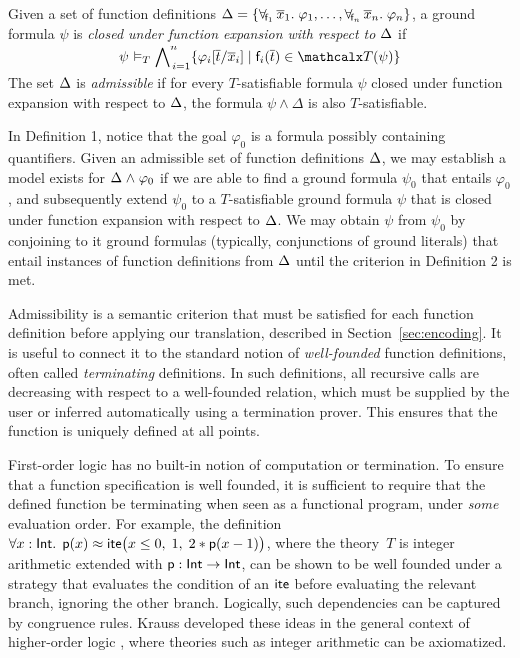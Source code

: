 \begin{definition}\rm
Given a set of function definitions
$\DDD = \{ \forallf{\con{f}_1} \vec x_1.\; \varphi_1, \dotsc, \forallf{\con{f}_n} \vec x_n.\; \varphi_n \}$,
a ground formula $\psi$
is \emph{closed under function expansion with respect to $\DDD$} if
\[\psi \models_T \smash{\bigwedge\nolimits_{\,i=1}^{n} \{ \varphi_i[ \vec t / \vec x_i ] \mid \con{f}_i( \vec t ) \in \terms( \psi ) \}}\]
The set $\DDD$ is \emph{admissible} if for every $T$-satisfiable formula
$\psi$ closed under function expansion with respect to $\DDD$,
the formula
$\psi \wedge \Delta$ is also $T$-satisfiable.
\end{definition}

In Definition 1, notice that the goal $\varphi_0$ is a formula possibly containing quantifiers.
Given an admissible set of function definitions $\DDD$, 
we may establish a model exists for $\DDD \wedge \varphi_0$ 
if we are able to find a ground formula $\psi_0$ that entails $\varphi_0$,
and subsequently extend $\psi_0$ to a $T$-satisfiable ground formula $\psi$ that is closed under function expansion with respect to $\DDD$.
We may obtain $\psi$ from $\psi_0$ by conjoining to it ground formulas 
(typically, conjunctions of ground literals) that entail instances of function definitions from $\DDD$ until the criterion in Definition 2 is met.

Admissibility is a semantic criterion that must be satisfied for each function
definition before applying our translation, described in
Section~\ref{sec:encoding}. It is useful to connect it to the
standard notion of \emph{well-founded} function definitions, often called
\emph{terminating} definitions. %
In such definitions, all recursive calls are decreasing with respect to a well-founded
relation, which must be supplied by the user or inferred automatically
using a termination prover. This ensures that the function is uniquely defined
at all points.

First-order logic has no built-in notion of computation or termination. To ensure
that a function specification is well founded, it is sufficient to require that
the defined function be terminating when seen as a functional program, under \emph{some}
evaluation order. For example, the definition
$\forall x : {\mathsf{Int}}.\;\,
\mathsf{p}( x ) \approx \mathsf{ite}\bigl( x \leq 0,\allowbreak\;  1,\allowbreak\;
  2 * \mathsf{p}( x - 1 ) \bigr)$,
where the theory~$T$ is integer arithmetic extended with %
$\mathsf{p}:\mathsf{Int} \rightarrow \mathsf{Int}$, can be shown to be well founded
under a strategy that
evaluates the condition of an $\mathsf{ite}$ before evaluating the relevant branch,
ignoring the other branch. Logically, such dependencies can be captured by
congruence rules. Krauss developed these ideas in the general context of
higher-order logic \cite[Section 2]{krauss-2009-phd}, where theories such as
integer arithmetic can be axiomatized.

